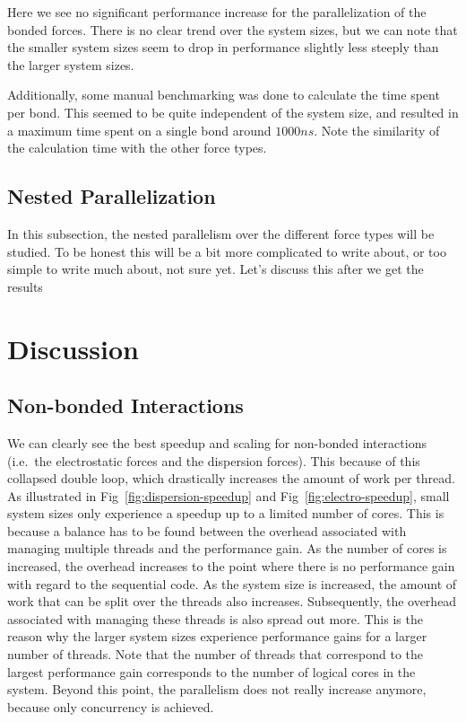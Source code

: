 \documentclass[conference]{IEEEtran}
\begin{document}
        Here we see no significant performance increase for the parallelization of the bonded forces. There is no
        clear trend over the system sizes, but we can note that the smaller system sizes seem to drop in performance
        slightly less steeply than the larger system sizes.

        Additionally, some manual benchmarking was done to calculate the time spent per bond. This
        seemed to be quite independent of the system size, and resulted in a maximum time spent on a single bond 
        around $1000 ns$. Note the similarity of the calculation time with the other force types.


    \subsection{Nested Parallelization}
    In this subsection, the nested parallelism over the different force types will be studied. To be honest this will
    be a bit more complicated to write about, or too simple to write much about, not sure yet. Let's discuss this
    after we get the results

\section{Discussion}
\subsection{Non-bonded Interactions}
We can clearly see the best speedup and scaling for non-bonded interactions (i.e.\ the electrostatic forces and 
the dispersion forces). This because of this collapsed double loop, which drastically increases the amount of
work per thread. As illustrated in Fig~\ref{fig:dispersion-speedup} and Fig~\ref{fig:electro-speedup}, small system
sizes only experience a speedup up to a limited number of cores. This is because a balance has to be found between
the overhead associated with managing multiple threads and the performance gain. As the number of cores is increased,
the overhead increases to the point where there is no performance gain with regard to the sequential code. As the
system size is increased, the amount of work that can be split over the threads also increases. Subsequently, the
overhead associated with managing these threads is also spread out more. This is the reason why the larger system
sizes experience performance gains for a larger number of threads. Note that the number of threads that correspond
to the largest performance gain corresponds to the number of logical cores in the system. Beyond this point, the
parallelism does not really increase anymore, because only concurrency is achieved.
\end{document}
